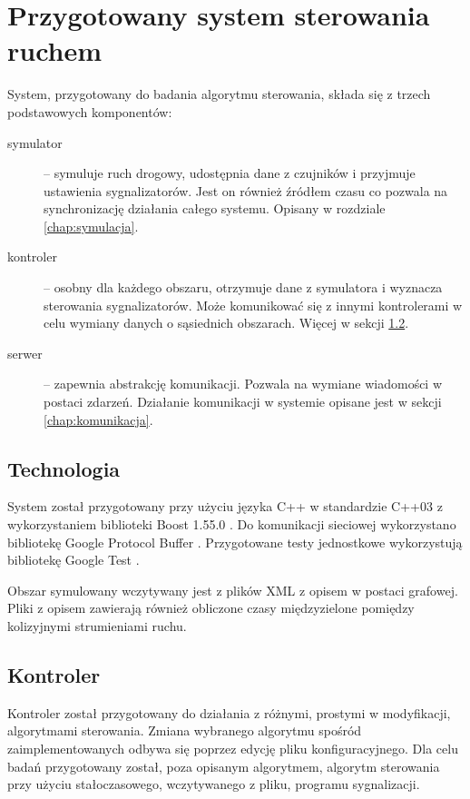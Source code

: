 \chapter{Przygotowany system sterowania ruchem}
System, przygotowany do badania algorytmu sterowania, składa się z trzech podstawowych komponentów:
\begin{description}
	\item[symulator] --
		symuluje ruch drogowy, udostępnia dane z czujników i przyjmuje ustawienia sygnalizatorów.
		Jest on również źródłem czasu co pozwala na synchronizację działania całego systemu. Opisany w rozdziale \ref{chap:symulacja}.
	\item[kontroler] --
		osobny dla każdego obszaru, otrzymuje dane z symulatora i wyznacza sterowania sygnalizatorów.
		Może komunikować się z innymi kontrolerami w celu wymiany danych o sąsiednich obszarach. Więcej w sekcji \ref{chap:kontroler}.
	\item[serwer] --
		zapewnia abstrakcję komunikacji. Pozwala na wymiane wiadomości w postaci zdarzeń.
		Działanie komunikacji w systemie opisane jest w sekcji \ref{chap:komunikacja}.
\end{description}

\section{Technologia}
System został przygotowany przy użyciu języka C++ w standardzie C++03 z wykorzystaniem biblioteki Boost 1.55.0 \cite{boost}. Do komunikacji sieciowej wykorzystano bibliotekę Google Protocol Buffer \cite{protobuf}. Przygotowane testy jednostkowe wykorzystują bibliotekę Google Test \cite{gtest}.

Obszar symulowany wczytywany jest z plików XML z opisem w postaci grafowej. Pliki z opisem zawierają również obliczone czasy międzyzielone pomiędzy kolizyjnymi strumieniami ruchu.

\section{Kontroler}
\label{chap:kontroler}
Kontroler został przygotowany do działania z różnymi, prostymi w modyfikacji, algorytmami sterowania. Zmiana wybranego algorytmu spośród zaimplementowanych odbywa się poprzez edycję pliku konfiguracyjnego. Dla celu badań przygotowany został, poza opisanym algorytmem, algorytm sterowania przy użyciu stałoczasowego, wczytywanego z pliku, programu sygnalizacji.

